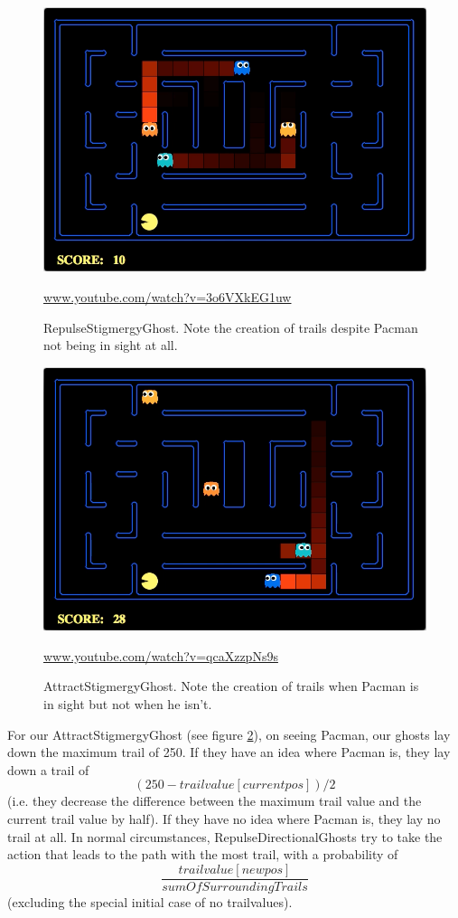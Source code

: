 \documentclass[11pt]{article}
\begin{document}
\begin{multicols}{2}
\begin{figure}[H]
	\includegraphics[width=\columnwidth]{RepulseGhost.png}
	\caption{RepulseStigmergyGhost. Note the creation of trails despite Pacman not being in sight at all.}
	\protect\url{www.youtube.com/watch?v=3o6VXkEG1uw} 
	\label{fig:repulseghost}
\end{figure}
\begin{figure}[H]
	\includegraphics[width=\columnwidth]{AttractGhost.png}
	\caption{AttractStigmergyGhost. Note the creation of trails when Pacman is in sight but not when he isn't.}
	\protect\url{www.youtube.com/watch?v=qcaXzzpNs9s} 
	\label{fig:attractghost}
\end{figure}

For our AttractStigmergyGhost (see figure \ref{fig:attractghost}), on seeing Pacman, our ghosts lay down the maximum trail of 250.  If they have an idea where Pacman is, they lay down a trail of $$(250 - trailvalue[currentpos]) / 2 $$ (i.e. they decrease the difference between the maximum trail value and the current trail value by half).   If they have no idea where Pacman is, they lay no trail at all. In normal circumstances, RepulseDirectionalGhosts try to take the action that leads to the path with the most trail, with a probability of $$\frac{trailvalue[newpos]}{sumOfSurroundingTrails}$$ (excluding the special initial case of no trailvalues).  




\end{multicols}
\end{document}
